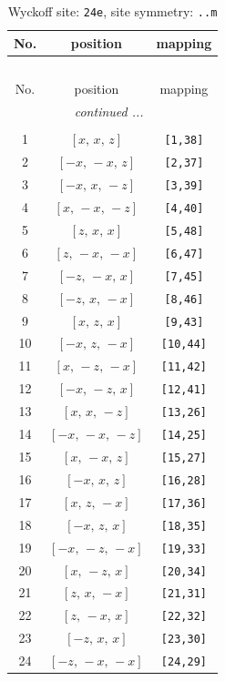 \documentclass[fleqn,8pt]{jsarticle}
\begin{document}
\renewcommand{\arraystretch}{1.2}
\begin{longtable}{ccc}
\caption{Wyckoff site: {\tt 24e}, site symmetry: {\tt ..m}}
 \\
 \hline \hline
No. & position & mapping \\ \hline \endfirsthead

\multicolumn{2}{l}{\tablename\ \thetable{}} \\
 \hline \hline
No. & position & mapping \\ \hline \endhead

 \hline \hline
\multicolumn{2}{r}{\footnotesize\it continued ...} \\ \endfoot

 \hline \hline
\multicolumn{2}{r}{} \\ \endlastfoot

1 & $\left[ x,\, x,\, z \right]$ & {\tt [1,38]} \\ \hline
2 & $\left[ - x,\, - x,\, z \right]$ & {\tt [2,37]} \\ \hline
3 & $\left[ - x,\, x,\, - z \right]$ & {\tt [3,39]} \\ \hline
4 & $\left[ x,\, - x,\, - z \right]$ & {\tt [4,40]} \\ \hline
5 & $\left[ z,\, x,\, x \right]$ & {\tt [5,48]} \\ \hline
6 & $\left[ z,\, - x,\, - x \right]$ & {\tt [6,47]} \\ \hline
7 & $\left[ - z,\, - x,\, x \right]$ & {\tt [7,45]} \\ \hline
8 & $\left[ - z,\, x,\, - x \right]$ & {\tt [8,46]} \\ \hline
9 & $\left[ x,\, z,\, x \right]$ & {\tt [9,43]} \\ \hline
10 & $\left[ - x,\, z,\, - x \right]$ & {\tt [10,44]} \\ \hline
11 & $\left[ x,\, - z,\, - x \right]$ & {\tt [11,42]} \\ \hline
12 & $\left[ - x,\, - z,\, x \right]$ & {\tt [12,41]} \\ \hline
13 & $\left[ x,\, x,\, - z \right]$ & {\tt [13,26]} \\ \hline
14 & $\left[ - x,\, - x,\, - z \right]$ & {\tt [14,25]} \\ \hline
15 & $\left[ x,\, - x,\, z \right]$ & {\tt [15,27]} \\ \hline
16 & $\left[ - x,\, x,\, z \right]$ & {\tt [16,28]} \\ \hline
17 & $\left[ x,\, z,\, - x \right]$ & {\tt [17,36]} \\ \hline
18 & $\left[ - x,\, z,\, x \right]$ & {\tt [18,35]} \\ \hline
19 & $\left[ - x,\, - z,\, - x \right]$ & {\tt [19,33]} \\ \hline
20 & $\left[ x,\, - z,\, x \right]$ & {\tt [20,34]} \\ \hline
21 & $\left[ z,\, x,\, - x \right]$ & {\tt [21,31]} \\ \hline
22 & $\left[ z,\, - x,\, x \right]$ & {\tt [22,32]} \\ \hline
23 & $\left[ - z,\, x,\, x \right]$ & {\tt [23,30]} \\ \hline
24 & $\left[ - z,\, - x,\, - x \right]$ & {\tt [24,29]} \\
\end{longtable}
\end{document}
